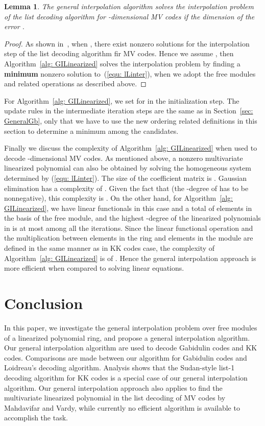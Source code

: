 \documentclass[11pt,onecolumn,draftcls]{IEEEtran}
\newtheorem{lemma}{Lemma}
\begin{document}
\begin{lemma} \label{lemma: 1Lalg1}
The general interpolation algorithm solves the interpolation problem of the list decoding algorithm for -dimensional MV codes if the dimension of the error .
\end{lemma}
\begin{proof}
As shown in~\cite{mahdavifar_isit10}, when , there exist nonzero solutions for the interpolation step of the list decoding algorithm fir MV codes. Hence we assume , then Algorithm~\ref{alg: GILinearized} solves the interpolation problem by finding a \textbf{minimum} nonzero solution to~(\ref{equ: lLinter}), when we adopt the free modules and related operations as described above.
\end{proof}


For Algorithm~\ref{alg: GILinearized}, we set  for  in the initialization step. The update rules in the intermediate iteration steps are the same as in Section~\ref{sec: GeneralGb}, only that we have to use the new ordering related definitions in this section to determine a minimum among the  candidates.

Finally we discuss the complexity of Algorithm~\ref{alg: GILinearized} when used to decode -dimensional MV codes. As mentioned above, a nonzero multivariate linearized polynomial  can also be obtained by solving the homogeneous system determined by (\ref{equ: lLinter}). The size of the coefficient matrix is . Gaussian elimination has a complexity of  . Given the fact that  (the -degree of  has to be nonnegative), this complexity is . On the other hand, for Algorithm~\ref{alg: GILinearized}, we have  linear functionals in this case and a total of  elements in the basis of the free module, and the highest -degree of the linearized polynomials in  is at most  among all the iterations. Since the linear functional operation and the multiplication between elements in the ring and elements in the module are defined in the same manner as in KK codes case, the complexity of Algorithm~\ref{alg: GILinearized} is of . Hence the general interpolation approach is more efficient when compared to solving linear equations.




\section{Conclusion} \label{sec: conclusion}
In this paper, we investigate the general interpolation problem over free modules of a linearized polynomial ring, and propose a general interpolation algorithm. Our general interpolation algorithm are used to decode Gabidulin codes and KK codes. Comparisons are made between our algorithm for Gabidulin codes and Loidreau's decoding algorithm. Analysis shows that the Sudan-style list-1 decoding algorithm for KK codes is a special case of our general interpolation algorithm. Our general interpolation approach also applies to find the multivariate linearized polynomial in the list decoding of MV codes by Mahdavifar and Vardy, while currently no efficient algorithm is available to accomplish the task.


\end{document}
